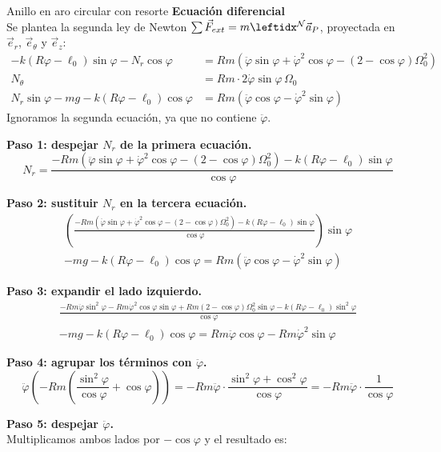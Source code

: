\begin{solucion}{Anillo en aro circular con resorte}
\textbf{Ecuación diferencial}\\
Se plantea la segunda ley de Newton $\sum\vec{F}_{ext}=m\marc{\vec{a}_P}{N}$, proyectada en $\vec{e}_r$, $\vec{e}_\theta$ y $\vec{e}_z$:
\begin{align*}
-k(R\varphi-\ell_0)\sin\varphi - N_r\cos\varphi &= Rm \left( \ddot{\varphi} \sin\varphi + \dot{\varphi}^2 \cos\varphi - (2 - \cos\varphi) \Omega_0^2 \right)\\
N_\theta &= Rm \cdot 2 \dot{\varphi} \sin\varphi\, \Omega_0 \\
N_r\sin\varphi - mg - k(R\varphi - \ell_0)\cos\varphi &= Rm \left( \ddot{\varphi} \cos\varphi - \dot{\varphi}^2 \sin\varphi \right)
\end{align*}
Ignoramos la segunda ecuación, ya que no contiene $\ddot{\varphi}$.

\textbf{Paso 1: despejar $N_r$ de la primera ecuación.}
$$N_r = \frac{ -Rm \left( \ddot{\varphi} \sin\varphi + \dot{\varphi}^2 \cos\varphi - (2 - \cos\varphi) \Omega_0^2 \right) - k(R\varphi - \ell_0)\sin\varphi }{ \cos\varphi }$$

\textbf{Paso 2: sustituir $N_r$ en la tercera ecuación.}
\begin{multline*}
\left( \frac{ -Rm \left( \ddot{\varphi} \sin\varphi + \dot{\varphi}^2 \cos\varphi - (2 - \cos\varphi) \Omega_0^2 \right) - k(R\varphi - \ell_0)\sin\varphi }{ \cos\varphi } \right)\sin\varphi\\
- mg - k(R\varphi - \ell_0)\cos\varphi = Rm \left( \ddot{\varphi} \cos\varphi - \dot{\varphi}^2 \sin\varphi \right)
\end{multline*}

\textbf{Paso 3: expandir el lado izquierdo.}
\begin{multline*}
\frac{ -Rm \ddot{\varphi} \sin^2\varphi - Rm \dot{\varphi}^2 \cos\varphi\sin\varphi + Rm(2 - \cos\varphi) \Omega_0^2 \sin\varphi - k(R\varphi - \ell_0)\sin^2\varphi }{\cos\varphi}\\
- mg - k(R\varphi - \ell_0)\cos\varphi = Rm \ddot{\varphi} \cos\varphi - Rm \dot{\varphi}^2 \sin\varphi
\end{multline*}

\textbf{Paso 4: agrupar los términos con $\ddot{\varphi}$.}
$$\ddot{\varphi} \left( -Rm \left( \frac{\sin^2\varphi}{\cos\varphi} + \cos\varphi \right) \right)
= -Rm \ddot{\varphi} \cdot \frac{ \sin^2\varphi + \cos^2\varphi }{ \cos\varphi }
= -Rm \ddot{\varphi} \cdot \frac{1}{\cos\varphi}$$

\textbf{Paso 5: despejar $\ddot{\varphi}$.}\\
Multiplicamos ambos lados por $-\cos\varphi$ y el resultado es:

\end{solucion}
